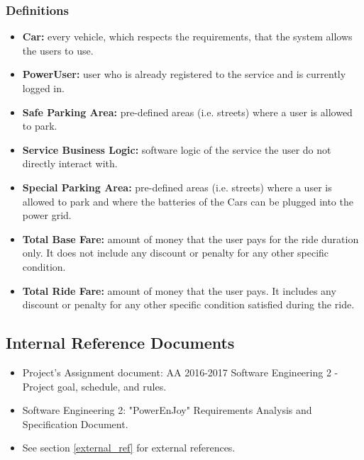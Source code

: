\subsubsection{Definitions}
\begin{itemize}
    \item \textbf{Car:} every vehicle, which respects the requirements, that the system allows the users to use.
    \item\textbf{PowerUser:} user who is already registered to the service and is currently logged in.
    \item \textbf{Safe Parking Area:} pre-defined areas (i.e. streets) where a user is allowed to park.
    \item \textbf{Service Business Logic:} software logic of the service the user do not directly interact with.
    \item \textbf{Special Parking Area:} pre-defined areas (i.e. streets) where a user is allowed to park and where the batteries of the Cars can be plugged into the power grid.
    \item \textbf{Total Base Fare:} amount of money that the user pays for the ride duration only. It does not include any discount or penalty for any other specific condition.
    \item \textbf{Total Ride Fare:} amount of money that the user pays. It includes any discount or penalty for any other specific condition satisfied during the ride.
\end{itemize}

\subsection{Internal Reference Documents}
\label{internal_ref}
\begin{itemize}
    \item Project’s Assignment document: AA 2016-2017 Software Engineering 2 - Project goal, schedule, and rules.
    \item Software Engineering 2: "PowerEnJoy" Requirements Analysis and Specification Document.
    \item See section \ref{external_ref} for external references.
\end{itemize}

